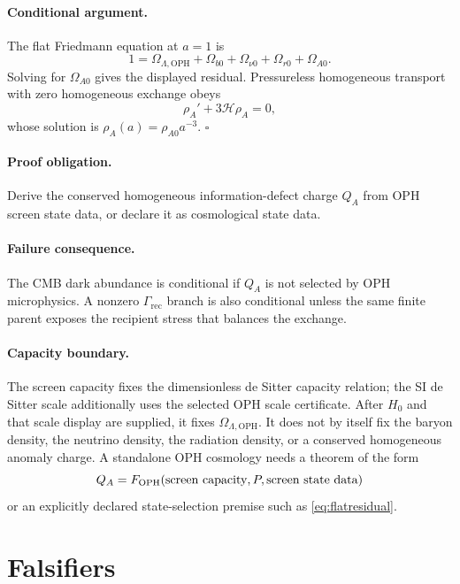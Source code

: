 \documentclass[11pt]{article}
\newcommand{\OPH}{\mathrm{OPH}}
\begin{document}
\paragraph{Conditional argument.}
The flat Friedmann equation at \(a=1\) is
\begin{equation}
  1
  =
  \Omega_{\Lambda,\OPH}
  +\Omega_{b0}+\Omega_{\nu0}+\Omega_{r0}+\Omega_{A0}.
\end{equation}
Solving for \(\Omega_{A0}\) gives the displayed residual.  Pressureless
homogeneous transport with zero homogeneous exchange obeys
\[
  \rho_A'+3\mathcal H\rho_A=0,
\]
whose solution is \(\rho_A(a)=\rho_{A0}a^{-3}\). \(\square\)

\paragraph{Proof obligation.}
Derive the conserved homogeneous information-defect charge \(Q_A\) from OPH
screen state data, or declare it as cosmological state data.

\paragraph{Failure consequence.}
The CMB dark abundance is conditional if \(Q_A\) is not selected by OPH
microphysics.  A nonzero \(\Gamma_{\mathrm{rec}}\) branch is also conditional
unless the same finite parent exposes the recipient stress that balances the
exchange.

\paragraph{Capacity boundary.}
The screen capacity fixes the dimensionless de Sitter capacity relation; the
SI de Sitter scale additionally uses the selected OPH scale certificate.  After
\(H_0\) and that scale display are supplied, it fixes \(\Omega_{\Lambda,\OPH}\).
It does not by itself fix the baryon density,
the neutrino density, the radiation density, or a conserved homogeneous
anomaly charge.  A standalone OPH cosmology needs a theorem of the form
\[
  Q_A=F_{\OPH}(\hbox{screen capacity},P,\hbox{screen state data})
\]
or an explicitly declared state-selection premise such as
\eqref{eq:flatresidual}.

\section{Falsifiers}
\end{document}
